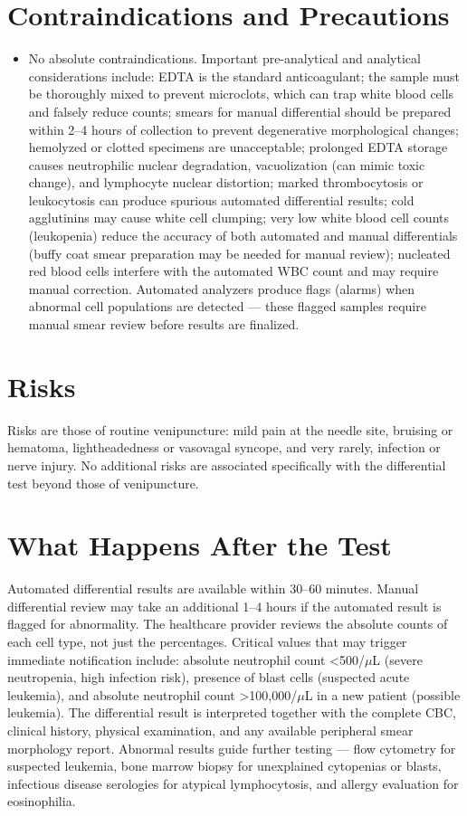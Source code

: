 \section*{Contraindications and Precautions}
\begin{itemize}
  \item No absolute contraindications. Important pre-analytical and analytical considerations include: EDTA is the standard anticoagulant; the sample must be thoroughly mixed to prevent microclots, which can trap white blood cells and falsely reduce counts; smears for manual differential should be prepared within 2--4 hours of collection to prevent degenerative morphological changes; hemolyzed or clotted specimens are unacceptable; prolonged EDTA storage causes neutrophilic nuclear degradation, vacuolization (can mimic toxic change), and lymphocyte nuclear distortion; marked thrombocytosis or leukocytosis can produce spurious automated differential results; cold agglutinins may cause white cell clumping; very low white blood cell counts (leukopenia) reduce the accuracy of both automated and manual differentials (buffy coat smear preparation may be needed for manual review); nucleated red blood cells interfere with the automated WBC count and may require manual correction. Automated analyzers produce flags (alarms) when abnormal cell populations are detected --- these flagged samples require manual smear review before results are finalized.
\end{itemize}
\section*{Risks}
Risks are those of routine venipuncture: mild pain at the needle site, bruising or hematoma, lightheadedness or vasovagal syncope, and very rarely, infection or nerve injury. No additional risks are associated specifically with the differential test beyond those of venipuncture.

\section*{What Happens After the Test}
Automated differential results are available within 30--60 minutes. Manual differential review may take an additional 1--4 hours if the automated result is flagged for abnormality. The healthcare provider reviews the absolute counts of each cell type, not just the percentages. Critical values that may trigger immediate notification include: absolute neutrophil count <500/$\mu$L (severe neutropenia, high infection risk), presence of blast cells (suspected acute leukemia), and absolute neutrophil count >100,000/$\mu$L in a new patient (possible leukemia). The differential result is interpreted together with the complete CBC, clinical history, physical examination, and any available peripheral smear morphology report. Abnormal results guide further testing --- flow cytometry for suspected leukemia, bone marrow biopsy for unexplained cytopenias or blasts, infectious disease serologies for atypical lymphocytosis, and allergy evaluation for eosinophilia.

